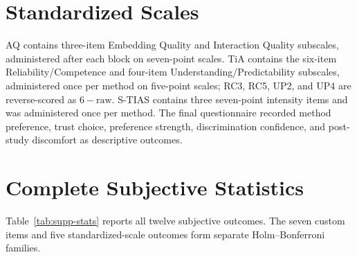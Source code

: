 \documentclass[review]{vgtc}
\begin{document}
\section{Standardized Scales}\label{sec:supp-scales}

AQ contains three-item Embedding Quality and Interaction Quality
subscales, administered after each block on seven-point scales. TiA contains the
six-item Reliability/Competence and four-item Understanding/Predictability
subscales, administered once per method on five-point scales; RC3, RC5, UP2, and
UP4 are reverse-scored as $6-\text{raw}$. S-TIAS contains three seven-point
intensity items and was administered once per method. The final questionnaire
recorded method preference, trust choice, preference strength, discrimination
confidence, and post-study discomfort as descriptive outcomes.

\section{Complete Subjective Statistics}\label{sec:supp-stats}

Table~\ref{tab:supp-stats} reports all twelve subjective outcomes. The seven custom
items and five standardized-scale outcomes form separate Holm--Bonferroni families.
\end{document}
